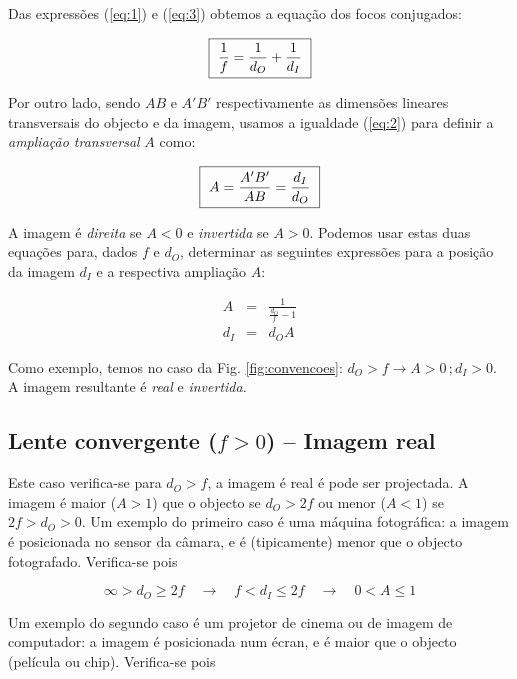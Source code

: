 \documentclass[a4paper,12pt]{article}      %
\begin{document}
Das expressões (\ref{eq:1}) e (\ref{eq:3}) obtemos a equação dos focos conjugados:
 
 \begin{equation}
	\label{eq:focosconjug}
    \fbox{
        $ \displaystyle
	\frac{1}{f} = \frac{1}{d_O} +\frac{1}{d_I} 
        $
    }
\end{equation}

Por outro lado, sendo $AB$ e $A'B'$ respectivamente as dimensões lineares transversais do objecto e da imagem, usamos a igualdade (\ref{eq:2}) para definir a \emph{ampliação transversal} $A$ como:

 \begin{equation}
    \fbox{
        $ \displaystyle
A =  \frac{A'B'}{ AB} =\frac{d_I}{d_O}
$
}
\end{equation}
 
A imagem é \emph{direita} se $A<0$ e \emph{invertida} se $A>0$. Podemos usar estas duas equações para, dados $f$ e $d_O$, determinar as seguintes expressões para a posição da imagem $d_I$ e a respectiva ampliação $A$:
 
\begin{eqnarray}
A&=&\frac{1}{\frac{d_O}{f}-1}\\
d_I&=&d_OA
\end{eqnarray}

 
Como exemplo, temos no caso da Fig. \ref{fig:convencoes}: $d_O>f \to A> 0\,; d_I > 0$. A imagem resultante é \emph{real} e \emph{invertida}.

\subsection{\sf Lente convergente ($f>0$) -- Imagem real}
Este caso verifica-se para $d_O>f$, a imagem é real é pode ser projectada. A imagem é maior ($A>1$) que o objecto se $d_O>2f$ ou menor ($A<1$) se $2f>d_O>0$. Um exemplo do primeiro caso é uma máquina fotográfica: a imagem é posicionada no sensor da câmara, e é (tipicamente) menor que o objecto fotografado. Verifica-se   pois

\begin{equation}
\infty > d_O \ge 2 f \quad \to \quad f < d_I \le 2 f  \quad \to \quad 0<A\le 1
\end{equation}

Um exemplo do segundo caso é um projetor de cinema ou de imagem de computador: a imagem é posicionada num écran, e é maior que o objecto (película ou chip). Verifica-se   pois
\end{document}
